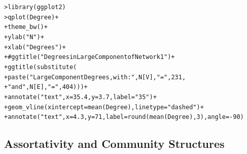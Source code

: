 \documentclass[12pt]{article}\usepackage[]{graphicx}\usepackage[]{color}
\makeatletter
\newcommand{\hlnum}[1]{\textcolor[rgb]{0.82,0.78,0.62}{#1}}%
\newcommand{\hlstr}[1]{\textcolor[rgb]{0.82,0.78,0.62}{#1}}%
\newcommand{\hlcom}[1]{\textcolor[rgb]{0.404,0.408,0.42}{#1}}%
\newcommand{\hlopt}[1]{\textcolor[rgb]{0.882,0.878,0.898}{#1}}%
\newcommand{\hlstd}[1]{\textcolor[rgb]{0.882,0.878,0.898}{#1}}%
\newcommand{\hlkwc}[1]{\textcolor[rgb]{0.812,0.522,0.388}{#1}}%
\newcommand{\hlkwd}[1]{\textcolor[rgb]{0.733,0.388,0.812}{#1}}%
\newenvironment{kframe}{%
 \def\at@end@of@kframe{}%
 \ifinner\ifhmode%
  \def\at@end@of@kframe{\end{minipage}}%
  \begin{minipage}{\columnwidth}%
 \fi\fi%
 \def\FrameCommand##1{\hskip\@totalleftmargin \hskip-\fboxsep
 \colorbox{shadecolor}{##1}\hskip-\fboxsep
     \hskip-\linewidth \hskip-\@totalleftmargin \hskip\columnwidth}%
 \MakeFramed {\advance\hsize-\width
   \@totalleftmargin\z@ \linewidth\hsize
   \@setminipage}}%
 {\par\unskip\endMakeFramed%
 \at@end@of@kframe}
\newenvironment{knitrout}{}{} %
\makeatother
\begin{document}
\begin{flushleft}
\begin{center}
\begin{knitrout}
\begin{kframe}
{\ttfamily\noindent\bfseries\color{errorcolor}{\#\# Error in h(simpleError(msg, call)): error in evaluating the argument 'x' in selecting a method for function 'mean': object 'Degree' not found}}\begin{alltt}
\hlstd{> }\hlkwd{library}\hlstd{(ggplot2)}
\hlstd{> }\hlkwd{qplot}\hlstd{(Degree)}\hlopt{+}
\hlstd{+ }     \hlkwd{theme_bw}\hlstd{()}\hlopt{+}
\hlstd{+ }     \hlkwd{ylab}\hlstd{(}\hlstr{"N"}\hlstd{)}\hlopt{+}
\hlstd{+ }     \hlkwd{xlab}\hlstd{(}\hlstr{"Degrees"}\hlstd{)}\hlopt{+}
\hlstd{+ }     \hlcom{#ggtitle("Degrees in Large Component of Network 1")+}
\hlstd{+ }     \hlkwd{ggtitle}\hlstd{(}\hlkwd{substitute}\hlstd{(}
\hlstd{+ }          \hlkwd{paste}\hlstd{(} \hlstr{"Large Component Degrees, with: "}\hlstd{, N[V],} \hlstr{"="}\hlstd{,} \hlnum{231}\hlstd{,}
\hlstd{+ }                 \hlstr{" and "}\hlstd{, N[E],} \hlstr{"="}\hlstd{,} \hlnum{404}\hlstd{)))}\hlopt{+}
\hlstd{+ }     \hlkwd{annotate}\hlstd{(}\hlstr{"text"}\hlstd{,} \hlkwc{x} \hlstd{=} \hlnum{35.4}\hlstd{,} \hlkwc{y} \hlstd{=} \hlnum{3.7}\hlstd{,} \hlkwc{label} \hlstd{=} \hlstr{"35"}\hlstd{)}\hlopt{+}
\hlstd{+ }     \hlkwd{geom_vline}\hlstd{(}\hlkwc{xintercept}\hlstd{=}\hlkwd{mean}\hlstd{(Degree),} \hlkwc{linetype}\hlstd{=}\hlstr{"dashed"}\hlstd{)}\hlopt{+}
\hlstd{+ }     \hlkwd{annotate}\hlstd{(}\hlstr{"text"}\hlstd{,} \hlkwc{x} \hlstd{=} \hlnum{4.3}\hlstd{,} \hlkwc{y} \hlstd{=} \hlnum{71}\hlstd{,} \hlkwc{label} \hlstd{=} \hlkwd{round}\hlstd{(}\hlkwd{mean}\hlstd{(Degree),}\hlnum{3}\hlstd{),} \hlkwc{angle}\hlstd{=}\hlopt{-}\hlnum{90}\hlstd{)}
\end{alltt}


{\ttfamily\noindent\bfseries\color{errorcolor}{\#\# Error in eval\_tidy(mapping\$x, data, caller\_env): object 'Degree' not found}}\end{kframe}
\end{knitrout}
\end{center}

\subsection{Assortativity and Community Structures}


\end{flushleft}
\end{document}
